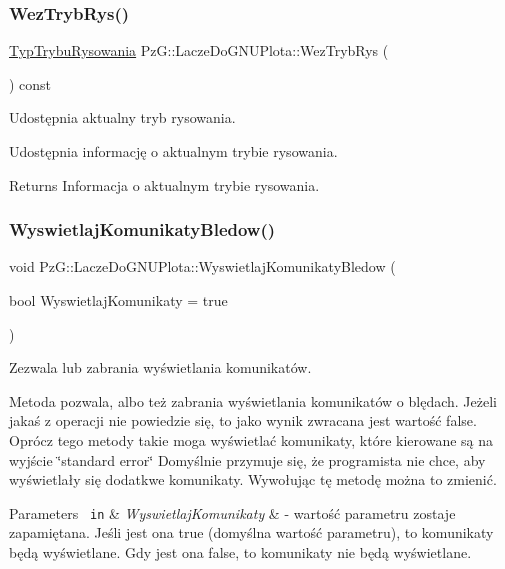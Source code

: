 \subsubsection{\texorpdfstring{WezTrybRys()}{WezTrybRys()}}
{\footnotesize\ttfamily \mbox{\hyperlink{namespace_pz_g_aef59d70a0ee2eab473790613c3628944}{Typ\+Trybu\+Rysowania}} Pz\+G\+::\+Lacze\+Do\+G\+N\+U\+Plota\+::\+Wez\+Tryb\+Rys (\begin{DoxyParamCaption}{ }\end{DoxyParamCaption}) const\hspace{0.3cm}{\ttfamily [inline]}}



Udostępnia aktualny tryb rysowania. 

Udostępnia informację o aktualnym trybie rysowania. \begin{DoxyReturn}{Returns}
Informacja o aktualnym trybie rysowania. 
\end{DoxyReturn}
\mbox{\label{class_pz_g_1_1_lacze_do_g_n_u_plota_a409f4f4ba52b2b246d5695daef12167d}} 
\subsubsection{\texorpdfstring{WyswietlajKomunikatyBledow()}{WyswietlajKomunikatyBledow()}}
{\footnotesize\ttfamily void Pz\+G\+::\+Lacze\+Do\+G\+N\+U\+Plota\+::\+Wyswietlaj\+Komunikaty\+Bledow (\begin{DoxyParamCaption}\item[{bool}]{Wyswietlaj\+Komunikaty = {\ttfamily true} }\end{DoxyParamCaption})}



Zezwala lub zabrania wyświetlania komunikatów. 

Metoda pozwala, albo też zabrania wyświetlania komunikatów o blędach. Jeżeli jakaś z operacji nie powiedzie się, to jako wynik zwracana jest wartość {\ttfamily false}. Oprócz tego metody takie moga wyświetlać komunikaty, które kierowane są na wyjście \char`\"{}standard error\char`\"{} Domyślnie przymuje się, że programista nie chce, aby wyświetlały się dodatkwe komunikaty. Wywołując tę metodę można to zmienić. 
\begin{DoxyParams}[1]{Parameters}
\mbox{\texttt{ in}}  & {\em Wyswietlaj\+Komunikaty} & -\/ wartość parametru zostaje zapamiętana. Jeśli jest ona {\ttfamily true} (domyślna wartość parametru), to komunikaty będą wyświetlane. Gdy jest ona {\ttfamily false}, to komunikaty nie będą wyświetlane. \\
\hline
\end{DoxyParams}
\mbox{\label{class_pz_g_1_1_lacze_do_g_n_u_plota_a8e23479629af3df3d352b7839ae396b8}} 
